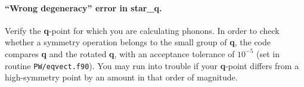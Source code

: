 \documentclass[12pt,a4paper]{article}
\begin{document}
\paragraph{``Wrong degeneracy'' error in star\_q.}

Verify the \textbf{q}-point for which you are calculating phonons.
In order to check whether a symmetry operation belongs to the small
group of \textbf{q}, the code compares \textbf{q} and the rotated
\textbf{q}, with an acceptance tolerance of $10^{-5}$ (set in routine
\texttt{PW/eqvect.f90}).
You may run into trouble if your \textbf{q}-point differs from a
high-symmetry point by an amount in that order of magnitude.
\end{document}
